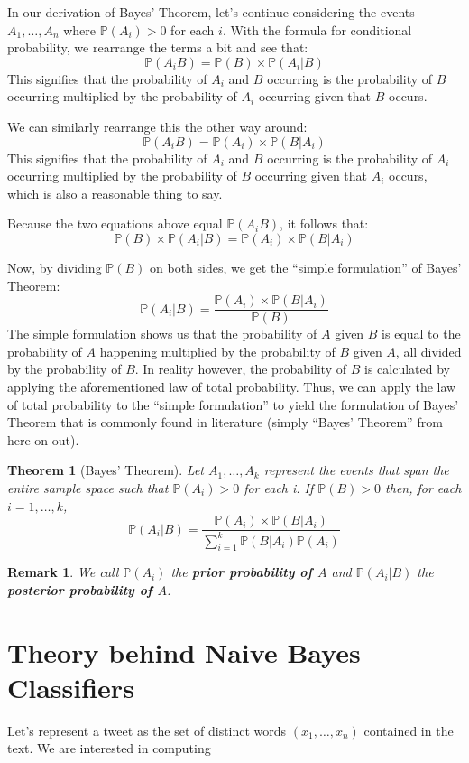 \documentclass[12pt]{article} \usepackage{amsmath,amssymb,amsthm}
\newtheorem{theorem}{Theorem}[section] \newtheorem*{remark}{Remark}
\begin{document}
In our derivation of Bayes' Theorem, let's continue considering the events
$A_1, \dots, A_n$ where $\mathbb{P}(A_i) > 0$ for each $i$. With the formula for
conditional probability, we rearrange the terms a bit and see that:
$$\mathbb{P}(A_i B) = \mathbb{P}(B) \times \mathbb{P}(A_i|B)$$
This signifies that the probability of $A_i$ and $B$ occurring is the
probability of $B$ occurring multiplied by the probability of $A_i$ occurring
given that $B$ occurs.

We can similarly rearrange this the other way around:
$$\mathbb{P}(A_iB) = \mathbb{P}(A_i) \times \mathbb{P}(B|A_i)$$
This signifies that the probability of $A_i$ and $B$ occurring is the
probability of $A_i$ occurring multiplied by the probability of $B$ occurring
given that $A_i$ occurs, which is also a reasonable thing to say.

Because the two equations above equal $\mathbb{P}(A_iB)$, it follows that:
$$\mathbb{P}(B) \times \mathbb{P}(A_i|B) = \mathbb{P}(A_i) \times \mathbb{P}(B|A_i)$$

Now, by dividing $\mathbb{P}(B)$ on both sides, we get the ``simple
formulation'' of Bayes' Theorem:
$$\mathbb{P}(A_i|B) = \frac{\mathbb{P}(A_i) \times \mathbb{P}(B|A_i)}{\mathbb{P}(B)}$$
The simple formulation shows us that the probability of $A$ given $B$ is equal
to the probability of $A$ happening multiplied by the probability of $B$ given
$A$, all divided by the probability of $B$. In reality however, the probability
of $B$ is calculated by applying the aforementioned law of total probability.
Thus, we can apply the law of total probability to the ``simple formulation'' to
yield the formulation of Bayes' Theorem that is commonly found in literature
(simply ``Bayes' Theorem'' from here on out).
\begin{theorem}[Bayes' Theorem]
  Let $A_1, \dots, A_k$ represent the events that span the entire sample space
  such that $\mathbb{P}(A_i) > 0$ for each i. If $\mathbb{P}(B) > 0$ then, for
  each $i = 1, \dots, k$,
  $$\mathbb{P}(A_i|B) = \frac{\mathbb{P}(A_i) \times \mathbb{P}(B|A_i)}{\sum \limits_{i=1}^{k} \mathbb{P}(B|A_i)\mathbb{P}(A_i)}$$
\end{theorem}

\begin{remark}
We call $\mathbb{P}(A_i)$ the \textbf{prior probability of $A$} and
$\mathbb{P}(A_i|B)$ the \textbf{posterior probability of $A$}.
\end{remark}
\section{Theory behind Naive Bayes Classifiers}
Let's represent a tweet as the set of distinct words $(x_1, \dots, x_n)$
contained in the text. We are interested in computing
\end{document}
